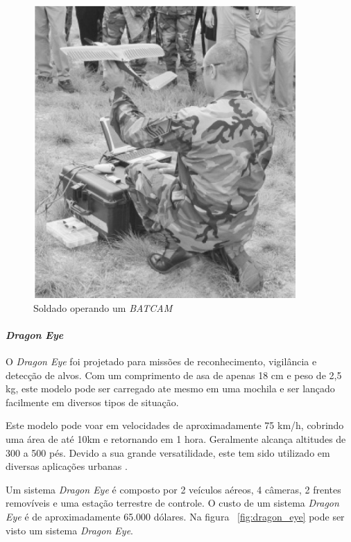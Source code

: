 \begin{figure}[h!]
\centering
\includegraphics[width=10cm]{pictures/batcam_system.png}
\caption{ Soldado operando um \emph{BATCAM} }
 \label{fig:holding_batcam}
\end{figure}


\paragraph{ \emph{Dragon Eye}}
O \vant \emph{Dragon Eye} foi projetado para missões de reconhecimento, vigilância e detecção de alvos. Com um comprimento de asa de apenas 18 cm e peso de 2,5 kg, este modelo pode ser carregado ate mesmo em uma mochila e ser lançado facilmente em diversos tipos de situação.

Este modelo pode voar em velocidades de aproximadamente 75 km/h, cobrindo uma área de até 10km e retornando em 1 hora. Geralmente alcança altitudes de 300 a 500 pés.
Devido a sua grande versatilidade, este \vant tem sido utilizado em diversas aplicações urbanas \cite{Drew2005,uav_roadmap2005}.

Um sistema \emph{Dragon Eye} é composto por 2 veículos aéreos, 4 câmeras, 2 frentes removíveis e uma estação terrestre de controle. O custo de um sistema \emph{Dragon Eye} é
de aproximadamente 65.000 dólares. Na figura ~\ref{fig:dragon_eye} pode ser visto um sistema \emph{Dragon Eye}.


